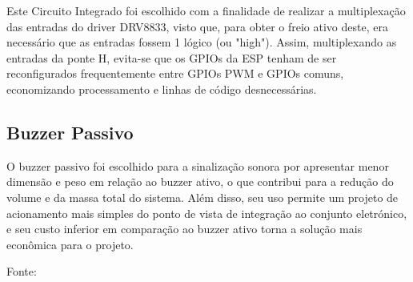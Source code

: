 Este Circuito Integrado foi escolhido com a finalidade de realizar a multiplexação das entradas do driver DRV8833, visto que, para obter o freio ativo deste, era necessário que as entradas fossem 1 lógico (ou "high"). Assim, multiplexando as entradas da ponte H, evita-se que os GPIOs da ESP tenham de ser reconfigurados frequentemente entre GPIOs PWM e GPIOs comuns, economizando processamento e linhas de código desnecessárias. 

\subsection{Buzzer Passivo}

O buzzer passivo foi escolhido para a sinalização sonora por apresentar menor dimens\~ao e peso em rela\c{c}\~ao ao buzzer ativo, o que contribui para a redu\c{c}\~ao do volume e da massa total do sistema. Al\'em disso, seu uso permite um projeto de acionamento mais simples do ponto de vista de integra\c{c}\~ao ao conjunto eletr\'onico, e seu custo inferior em compara\c{c}\~ao ao buzzer ativo torna a solu\c{c}\~ao mais econ\^omica para o projeto.

Fonte: \cite{makerhero_buzzer}
